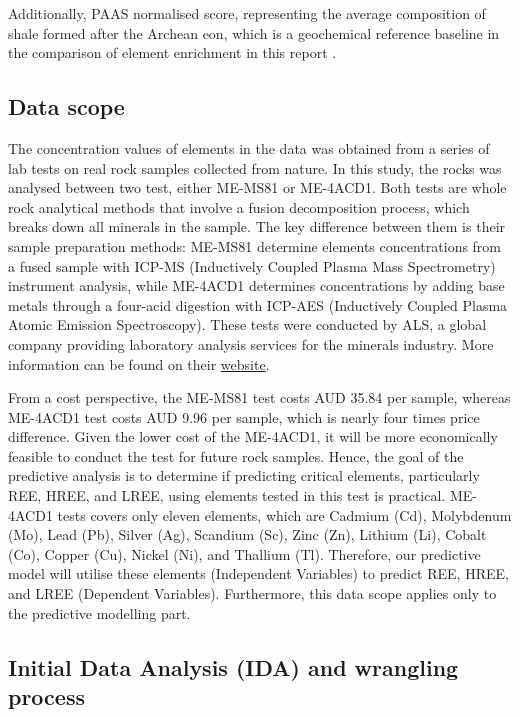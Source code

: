 \documentclass[11pt,a4paper,]{article}
\begin{document}
Additionally, PAAS normalised score, representing the average composition of shale formed after the Archean eon, which is a geochemical reference baseline in the comparison of element enrichment in this report \autocite{McLennan2011}.

\subsection{Data scope}\label{data-scope}

The concentration values of elements in the data was obtained from a series of lab tests on real rock samples collected from nature. In this study, the rocks was analysed between two test, either ME-MS81 or ME-4ACD1. Both tests are whole rock analytical methods that involve a fusion decomposition process, which breaks down all minerals in the sample. The key difference between them is their sample preparation methods: ME-MS81 determine elements concentrations from a fused sample with ICP-MS (Inductively Coupled Plasma Mass Spectrometry) instrument analysis, while ME-4ACD1 determines concentrations by adding base metals through a four-acid digestion with ICP-AES (Inductively Coupled Plasma Atomic Emission Spectroscopy). These tests were conducted by ALS, a global company providing laboratory analysis services for the minerals industry. More information can be found on their \href{https://www.alsglobal.com/en/geochemistry}{website}.

From a cost perspective, the ME-MS81 test costs AUD 35.84 per sample, whereas ME-4ACD1 test costs AUD 9.96 per sample, which is nearly four times price difference. Given the lower cost of the ME-4ACD1, it will be more economically feasible to conduct the test for future rock samples. Hence, the goal of the predictive analysis is to determine if predicting critical elements, particularly REE, HREE, and LREE, using elements tested in this test is practical. ME-4ACD1 tests covers only eleven elements, which are Cadmium (Cd), Molybdenum (Mo), Lead (Pb), Silver (Ag), Scandium (Sc), Zinc (Zn), Lithium (Li), Cobalt (Co), Copper (Cu), Nickel (Ni), and Thallium (Tl). Therefore, our predictive model will utilise these elements (Independent Variables) to predict REE, HREE, and LREE (Dependent Variables). Furthermore, this data scope applies only to the predictive modelling part.

\subsection{Initial Data Analysis (IDA) and wrangling process}\label{initial-data-analysis-ida-and-wrangling-process}
\end{document}
